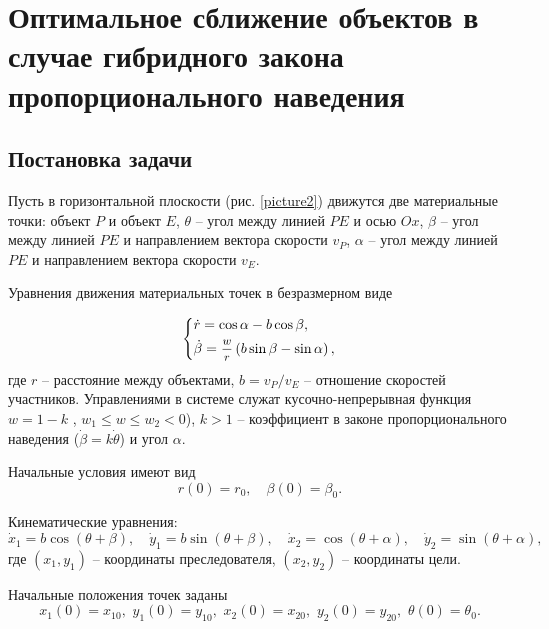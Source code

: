 \documentclass[a4paper,12pt, openany]{book}
\theoremstyle{plain} %
\theoremstyle{definition} %
\theoremstyle{remark} %
\numberwithin{equation}{chapter}
\begin{document}
{\newpage


\newpage

\chapter{Оптимальное сближение объектов в случае гибридного закона пропорционального наведения}

\section{Постановка задачи} Пусть в горизонтальной плоскости (рис. \ref{picture2}) движутся две материальные точки:  объект $P$ и объект $E$, $\theta$ -- угол между линией $PE$ и осью $Ox$, $\beta$ -- угол между линией $PE$ и направлением вектора скорости $v_P$, $\alpha$ -- угол между линией $PE$ и направлением вектора скорости $v_E$. 

Уравнения движения материальных точек в безразмерном виде

\begin{equation}\label{3.1}
\left\{ {\begin{aligned}
   & \dot r = \cos \alpha  - b\cos \beta , \hfill  \\
   & \dot \beta  = \mfrac{w}
{r}\left( {b\sin \beta  - \sin \alpha } \right), \hfill  \\
 \end{aligned} } \right.
\end{equation} 
где $r$ -- расстояние между объектами,  $b = v_P/v_E$ -- отношение скоростей участников. Управлениями в системе служат кусочно-непрерывная функция $w = 1-k$ , $w_1 \leqslant w \leqslant w_2 < 0$), $k>1$ -- коэффициент в законе пропорционального наведения ($\dot\beta = k\dot\theta$) и угол $\alpha$. 

Начальные условия имеют вид
\begin{equation}\label{3.2}
	r(0) = r_0, \quad \beta(0) = \beta_0.
\end{equation}

Кинематические уравнения:
\begin{equation}\label{3.3}
\dot x_1  = b\cos \left( {\theta  + \beta } \right), \quad \dot y_1  = b\sin \left( {\theta  + \beta } \right), \quad \dot x_2  = \cos \left( {\theta  + \alpha } \right), \quad \dot y_2  = \sin \left( {\theta  + \alpha } \right),
\end{equation}
где $(x_1,y_1)$ -- координаты преследователя, $(x_2,y_2)$ -- координаты цели.

Начальные положения точек заданы
\begin{equation}\label{3.4}
x_1 \left( 0 \right) = x_{10} ,\,\,y_1 \left( 0 \right) = y_{10} ,\,\,x_2 \left( 0 \right) = x_{20} ,\,\,y_2 \left( 0 \right) = y_{20} ,\,\,\theta \left( 0 \right) = \theta _0 .
\end{equation}

}
\end{document}

